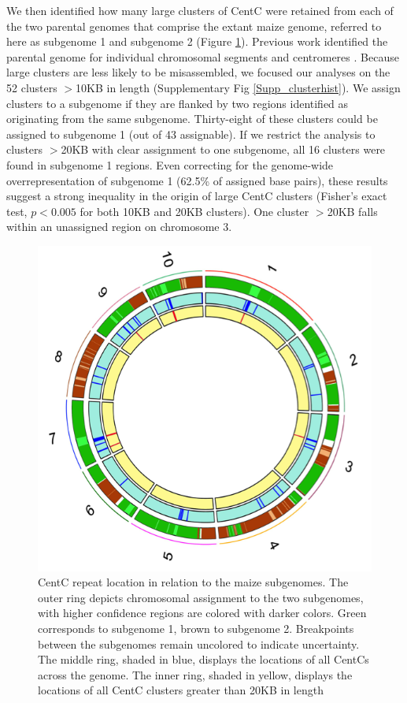 We then identified how many large clusters of CentC were retained from each of the two parental genomes that comprise the extant maize genome, referred to here as subgenome 1 and subgenome 2 (Figure \ref{circos}).  Previous work identified the parental genome for individual chromosomal segments \citep{Schnable2011} and centromeres \citep{Wang2012}.  Because large clusters are less likely to be misassembled, we focused our analyses on the 52 clusters $>$10KB in length (Supplementary Fig \ref{Supp_clusterhist}).  We assign clusters to a subgenome if they are flanked by two regions identified as originating from the same  subgenome.  Thirty-eight of these clusters could be assigned to subgenome 1 (out of 43 assignable). If we restrict the analysis to clusters  $>$20KB with clear assignment to one subgenome, all 16 clusters were found in subgenome 1 regions.  Even correcting for the genome-wide overrepresentation of subgenome 1 (62.5\% of assigned base pairs), these results suggest a strong inequality in the origin of large CentC clusters (Fisher's exact test, $p<0.005$ for both 10KB and 20KB clusters).  One cluster $>$20KB falls within an unassigned region on chromosome 3.

\begin{figure}
\includegraphics{Fig1_circos}
\caption{CentC repeat location in relation to the maize subgenomes.  The outer ring depicts chromosomal assignment to the two subgenomes, with higher confidence regions are colored with darker colors.  Green corresponds to subgenome 1, brown to subgenome 2.  Breakpoints between the subgenomes remain uncolored to indicate uncertainty. The middle ring, shaded in blue, displays the locations of all CentCs across the genome.  The inner ring, shaded in yellow, displays the locations of all CentC clusters greater than 20KB in length}
\label{circos}    
\end{figure}

